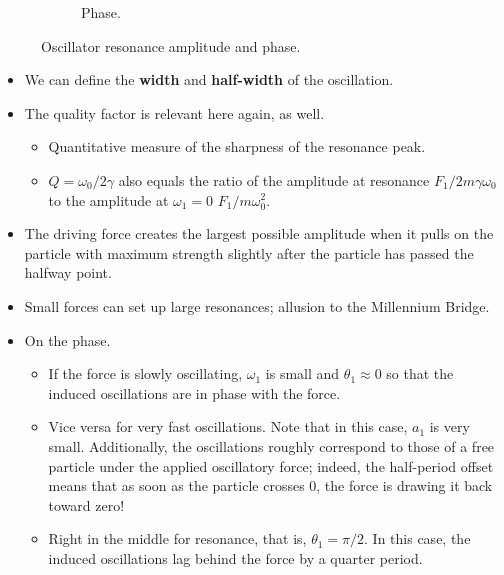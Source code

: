 \documentclass[../notes.tex]{subfiles}
\begin{document}
\begin{itemize}
\begin{figure}[h!]
\begin{subfigure}[b]{0.4\linewidth}
            \caption{Phase.}
            \label{fig:resb}
        \end{subfigure}
        \caption{Oscillator resonance amplitude and phase.}
        \label{fig:res}
    \end{figure}
    \begin{itemize}
        \item We can define the \textbf{width} and \textbf{half-width} of the oscillation.
        \item The quality factor is relevant here again, as well.
        \begin{itemize}
            \item Quantitative measure of the sharpness of the resonance peak.
            \item $Q=\omega_0/2\gamma$ also equals the ratio of the amplitude at resonance $F_1/2m\gamma\omega_0$ to the amplitude at $\omega_1=0$ $F_1/m\omega_0^2$.
        \end{itemize}
        \item The driving force creates the largest possible amplitude when it pulls on the particle with maximum strength slightly after the particle has passed the halfway point.
        \item Small forces can set up large resonances; allusion to the Millennium Bridge.
        \item On the phase.
        \begin{itemize}
            \item If the force is slowly oscillating, $\omega_1$ is small and $\theta_1\approx 0$ so that the induced oscillations are in phase with the force.
            \item Vice versa for very fast oscillations. Note that in this case, $a_1$ is very small. Additionally, the oscillations roughly correspond to those of a free particle under the applied oscillatory force; indeed, the half-period offset means that as soon as the particle crosses 0, the force is drawing it back toward zero!
            \item Right in the middle for resonance, that is, $\theta_1=\pi/2$. In this case, the induced oscillations lag behind the force by a quarter period.
        \end{itemize}

\end{itemize}
\end{itemize}
\end{document}
